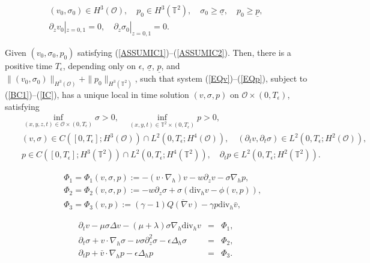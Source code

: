 \documentclass[10pt,a4paper]{amsart}
\begin{document}
\begin{eqnarray}
    (v_{0}, \sigma_{0})\in H^3(\mathcal O),\quad p_{0}\in H^3(\mathbb T^2),\quad
    \sigma_{0}\geq\underline\sigma, \quad p_{0}\geq\underline p,\label{ASSUMIC1}\\
    \partial_zv_{0}|_{z=0,1}=0,\quad \partial_z\sigma_{0}|_{z=0,1}=0.\label{ASSUMIC2}
\end{eqnarray}

\begin{proposition}
  \label{PROPLOC-e}
  Given $(v_{0}, \sigma_{0}, p_{0})$ satisfying (\ref{ASSUMIC1})--(\ref{ASSUMIC2}).
  Then, there is a positive time $T_\epsilon$,
  depending only on $\epsilon$, $\underline\sigma$, $\underline p$, and
  $\|(v_{0},\sigma_{0})\|_{H^3(\mathcal O)}+\|p_{0}\|_{H^3(\mathbb T^2)}$, such that system (\ref{EQv})--(\ref{EQp}),
  subject to (\ref{BC1})--(\ref{IC}), has a unique local in time solution $(v,\sigma,p)$ on $\mathcal O\times(0,T_\epsilon)$,
  satisfying
  \begin{eqnarray*}
  &&\inf_{(x,y,z,t)\in\mathcal O\times(0,T_\epsilon)}\sigma>0,\quad \inf_{(x,y,t)\in\mathbb T^2\times(0,T_\epsilon)}p>0,\\
    &&(v,\sigma)\in C([0,T_\epsilon]; H^3(\mathcal O))\cap L^2(0,T_\epsilon; H^4(\mathcal O)),\quad(\partial_tv,\partial_t\sigma)\in L^2(0,T_\epsilon; H^2(\mathcal O)),\\
    &&p\in C([0,T_\epsilon]; H^3(\mathbb T^2))\cap L^2(0,T_\epsilon; H^4(\mathbb T^2)),\quad\partial_tp\in  L^2(0,T_\epsilon; H^2(\mathbb T^2)).
  \end{eqnarray*}
\end{proposition}

\begin{eqnarray}
  &&\Phi_1=\Phi_1(v,\sigma,p):=-(v\cdot\nabla_h)v-w\partial_zv-\sigma\nabla_hp,\label{Phi1}\\
  &&\Phi_2=\Phi_2(v,\sigma,p):=-w\partial_z\sigma+\sigma(\text{div}_hv-\phi(v,p)),\label{Phi2}\\
  &&\Phi_3=\Phi_3(v,p):=(\gamma-1)\overline{Q(\nabla v)}-\gamma p\text{div}_h\bar v, \label{Phi3}
\end{eqnarray}

\begin{eqnarray}
  \partial_tv-\mu\sigma\Delta v-(\mu+\lambda)\sigma\nabla_h\text{div}_hv&=&\Phi_1,\label{EQv'}\\
  \partial_t\sigma+v\cdot\nabla_h\sigma-\nu\sigma\partial_z^2\sigma-\epsilon\Delta_h\sigma&=&\Phi_2,
  \label{EQs'}\\
  \partial_tp+\bar v\cdot\nabla_hp-\epsilon\Delta_hp&=&\Phi_3. \label{EQp'}
\end{eqnarray}
\end{document}
